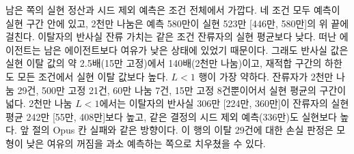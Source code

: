 남은 쪽의 실현 정산과 시드 제외 예측은 조건 전체에서 가깝다. 네 조건 모두 예측이 실현 구간 안에 있고, 2천만 나눔은 예측 580만이 실현 523만 [446만, 580만]의 위 끝에 걸친다. 이탈자의 반사실 잔류 가치는 같은 조건 잔류자의 실현 평균보다 낮다. 떠난 에이전트는 남은 에이전트보다 여유가 낮은 상태에 있었기 때문이다. 그래도 반사실 값은 실현 이탈 값의 약 2.5배(15만 고정)에서 140배(2천만 나눔)이고, 재적합 구간의 하한도 모든 조건에서 실현 이탈 값보다 높다. $L<1$ 행이 가장 약하다. 잔류자가 2천만 나눔 29건, 500만 고정 21건, 60만 나눔 7건, 15만 고정 8건뿐이어서 실현 평균의 구간이 넓다. 2천만 나눔 $L<1$에서는 이탈자의 반사실 306만 [224만, 360만]이 잔류자의 실현 평균 242만 [55만, 408만]보다 높고, 같은 결정의 시드 제외 예측(336만)도 실현보다 높다. 앞 절의 Opus 칸 실패와 같은 방향이다. 이 행의 이탈 29건에 대한 손실 판정은 모형이 낮은 여유의 꺼짐을 과소 예측하는 쪽으로 치우쳤을 수 있다.

\begin{table}[t]
\centering
\caption{남은 결정의 실현 정산과 이탈의 모형 반사실을 나눈 C-2 요약(만 토큰). 왼쪽은 LLM이 남은 결정(결정 단위) 수, 그 결정들의 실현 정산 평균 [시드 부트스트랩 95\% 구간], 같은 결정의 시드 제외 예측(초점 에이전트가 자기 모델의 보정 위험대로 행동)이다. 오른쪽은 LLM 이탈 수, 실현 이탈 값의 평균, 같은 이탈의 반사실 $\mathrm{EV}_{\mathrm{stay}}$(기준 가정, 원 적합 $R=1{,}600$ [재적합 200회 95\% 구간])다. 두 쪽은 서로 다른 결정이며 차이를 계산하지 않는다. 왼쪽의 실현 정산은 남은 에이전트의 관측이고, 떠난 에이전트가 남았다면 받았을 값으로 읽지 않는다. 오른쪽 반사실은 자기 시드를 포함한 3차 적합이며, 시드 제외 값은 표~\ref{val:w1-tab-tier}와 절~\ref{val:w1-oos}에 있다.}
\label{val:w1-tab-c2}
\end{table}

